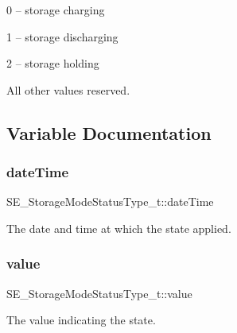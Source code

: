 0 – storage charging

1 – storage discharging

2 – storage holding

All other values reserved. 

\subsection{Variable Documentation}
\mbox{\label{group__StorageModeStatusType_ga1dd241e378a43cfe50b357e64ab10f6d}} 
\subsubsection{\texorpdfstring{date\+Time}{dateTime}}
{\footnotesize\ttfamily S\+E\+\_\+\+Storage\+Mode\+Status\+Type\+\_\+t\+::date\+Time}

The date and time at which the state applied. \mbox{\label{group__StorageModeStatusType_ga16c64971c00e1d804890fb324568bd9a}} 
\subsubsection{\texorpdfstring{value}{value}}
{\footnotesize\ttfamily S\+E\+\_\+\+Storage\+Mode\+Status\+Type\+\_\+t\+::value}

The value indicating the state. 